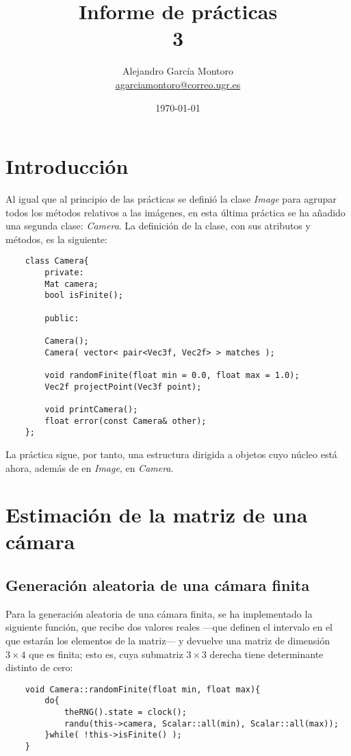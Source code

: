 \documentclass[a4paper, 11pt]{article}
\title{Informe de prácticas \\ 3}
\author{Alejandro García Montoro\\
\href{mailto:agarciamontoro@correo.ugr.es}{agarciamontoro@correo.ugr.es}}
\date{\today}
\theoremstyle{definition}
\theoremstyle{theorem}
\begin{document}
    \maketitle

    \section*{Introducción}
    Al igual que al principio de las prácticas se definió la clase \emph{Image} para agrupar todos los métodos relativos a las imágenes, en esta última práctica se ha añadido una segunda clase: \emph{Camera}. La definición de la clase, con sus atributos y métodos, es la siguiente:

    \begin{lstlisting}
    class Camera{
        private:
        Mat camera;
        bool isFinite();

        public:

        Camera();
        Camera( vector< pair<Vec3f, Vec2f> > matches );

        void randomFinite(float min = 0.0, float max = 1.0);
        Vec2f projectPoint(Vec3f point);

        void printCamera();
        float error(const Camera& other);
    };
    \end{lstlisting}

    La práctica sigue, por tanto, una estructura dirigida a objetos cuyo núcleo está ahora, además de en \emph{Image}, en \emph{Camera}.

    \section{Estimación de la matriz de una cámara}
    \subsection{Generación aleatoria de una cámara finita}

    Para la generación aleatoria de una cámara finita, se ha implementado la siguiente función, que recibe dos valores reales ---que definen el intervalo en el que estarán los elementos de la matriz--- y devuelve una matriz de dimensión $3\times4$ que es finita; esto es, cuya submatriz $3\times3$ derecha tiene determinante distinto de cero:

    \begin{lstlisting}
    void Camera::randomFinite(float min, float max){
        do{
            theRNG().state = clock();
            randu(this->camera, Scalar::all(min), Scalar::all(max));
        }while( !this->isFinite() );
    }
    \end{lstlisting}
\end{document}

